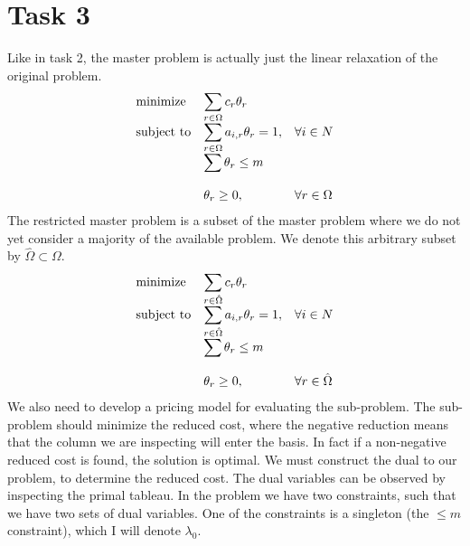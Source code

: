 \documentclass{article}
\begin{document}
    \section*{Task 3}
    Like in task 2, the master problem is actually just the linear relaxation of the original problem.
    \begin{equation*}
        \begin{array}{ll@{}ll}
            \text{minimize}  & \displaystyle\sum_{r \in \Omega} c_r \theta_r& &\\
            \text{subject to}& \displaystyle\sum_{r \in \Omega} a_{i, r} \theta_r = 1 ,&   &\forall i \in N\\
            & \displaystyle\sum \theta_r \leq m &&\\\\
            & \displaystyle \theta_r  \geq 0,  && \forall r \in \Omega
        \end{array}
    \end{equation*}
    The restricted master problem is a subset of the master problem where we do not yet consider a majority of the available problem.
    We denote this arbitrary subset by $\hat{\Omega} \subset \Omega$.
    \begin{equation*}
        \begin{array}{ll@{}ll}
            \text{minimize}  & \displaystyle\sum_{r \in \hat{\Omega}} c_r \theta_r& &\\
            \text{subject to}& \displaystyle\sum_{r \in \hat{\Omega}} a_{i, r} \theta_r = 1 ,&   &\forall i \in N\\
            & \displaystyle\sum \theta_r \leq m &&\\\\
            & \displaystyle \theta_r  \geq 0,  && \forall r \in \hat{\Omega}
        \end{array}
    \end{equation*}
    We also need to develop a pricing model for evaluating the sub-problem.
    The sub-problem should minimize the reduced cost, where the negative reduction means that the column we are inspecting will enter the basis.
    In fact if a non-negative reduced cost is found, the solution is optimal.
    We must construct the dual to our problem, to determine the reduced cost.
    The dual variables can be observed by inspecting the primal tableau.
    In the problem we have two constraints, such that we have two sets of dual variables.
    One of the constraints is a singleton (the $\leq m$ constraint), which I will denote $\lambda_0$.
\end{document}
